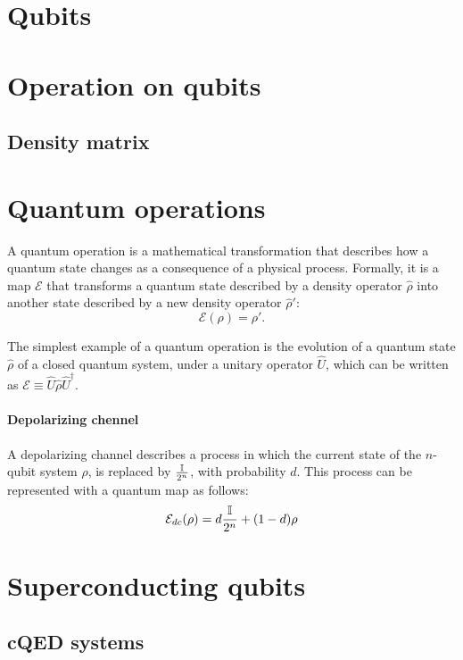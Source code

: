 \section{Qubits}
\section{Operation on qubits}
\subsection{Density matrix}
\section{Quantum operations}
A quantum operation is a mathematical transformation that describes how a quantum state changes as a consequence of a physical process. Formally, it is a map $\mathcal{E}$ that transforms a quantum state described by a density operator $\hat{\rho}$ into another state described by a new density operator $\hat{\rho}'$:
\begin{equation}
    \mathcal{E}(\rho) = \rho'\label{eq:quantum_map}.
\end{equation}

The simplest example of a quantum operation is the evolution of a quantum state $\hat{\rho}$ of a closed quantum system, under a unitary operator $\hat{U}$, which can be written as $\mathcal{E} \equiv \hat{U} \hat{\rho} \hat{U}^{\dagger}$.

\paragraph{Depolarizing chennel}
A depolarizing channel describes a process in which the current state of the $n$-qubit system $\rho$, is replaced by $\frac{\mathbb{I}}{2^n}$, with probability $d$. This process can be represented with a quantum map as follows:
\begin{equation}
    \mathcal{E}_{dc}(\rho) = d\frac{\mathbb{I}}{2^n}+(1-d)\rho\label{eq:depolarizing_channel}
\end{equation} 

\section{Superconducting qubits}

\subsection{cQED systems} \label{sec:cQED}
